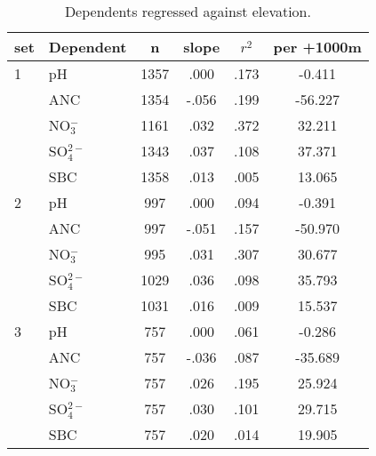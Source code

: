 \begin{table}[htbp]\scriptsize
\centering
\caption[Elevation trends]{Dependents regressed against elevation.}
\begin{tabular}{llcccc}
\toprule
set & Dependent & n & slope&$r^2$&per +1000m \\ 
\midrule
1   & pH               & 1357 & .000 & .173 & -0.411  \\ 
     & ANC            & 1354 & -.056 & .199 & -56.227  \\ 
     &  NO$_3^-$ & 1161 & .032 & .372 & 32.211  \\ 
     &  SO$_4^{2-}$& 1343 & .037 & .108 & 37.371  \\ 
     & SBC             & 1358 & .013 & .005 & 13.065  \\ 
\midrule
2   & pH               & 997 & .000 & .094 & -0.391  \\ 
     & ANC            & 997 & -.051 & .157 & -50.970  \\ 
     &  NO$_3^-$  & 995 & .031 & .307 & 30.677  \\ 
     &  SO$_4^{2-}$ & 1029 & .036 & .098 & 35.793  \\ 
     & SBC             & 1031 & .016 & .009 & 15.537  \\ 
 \midrule
3   & pH              & 757 & .000 & .061 & -0.286  \\ 
     & ANC           & 757 & -.036 & .087 & -35.689  \\ 
     &  NO$_3^-$ & 757 & .026 & .195 & 25.924  \\ 
     &  SO$_4^{2-}$ & 757 & .030 & .101 & 29.715  \\ 
     & SBC            & 757 & .020 & .014 & 19.905  \\ 
 \bottomrule
\end{tabular}
\label{Water quality per elevation}
\end{table}
